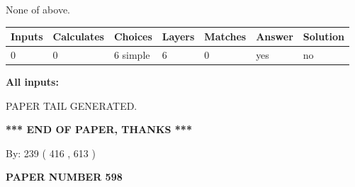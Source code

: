 \documentclass[12pt]{article}
\begin{document}
 
\noindent{}
 
 
 None of above.
 
 
\noindent{}
 
 
   
   
   
   
\noindent\begin{tabular}{|l|l|l|l|l|l|l|}
 \hline
Inputs & Calculates & Choices & Layers & Matches & Answer & Solution \\ \hline
 0  & 
 0  & 
 6
  simple  
  & 
 6  & 
 0  & 
  yes & 
  no 
  \\ \hline
 \end{tabular}
   
   
   
   
\noindent{}
   
   
   
   
\noindent\vspace{0.1in}\hspace{-0.08in} {\textbf{\Large{All inputs: }}}
   
   
   
   
   
   
 \vspace{0.2in}
 
   
   
\vspace{2.0in} PAPER TAIL GENERATED.
   
   
   
   
\vspace{1.0in} 
{\textbf{\large{ *** END OF PAPER, THANKS *** }}} 
   
   
\hspace{1.0in} By: 
 239 ( 416 ,  613 )
   
   
   
   
\newpage 
\setcounter{page}{ 
   598001 } 
   
   
   
   
 {\textbf{ \Large{ PAPER NUMBER  598  }}}
   
   
\vspace{0.2in}
   
   
   
\end{document}
